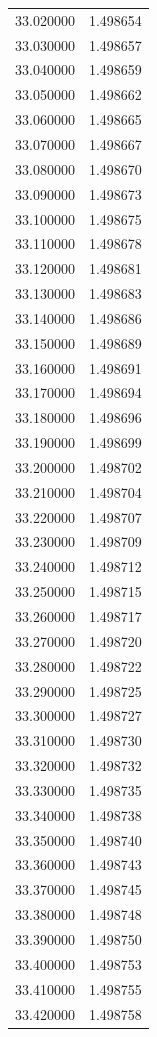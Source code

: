 \begin{tabular}{rr}
33.020000 & 1.498654 \\
33.030000 & 1.498657 \\
33.040000 & 1.498659 \\
33.050000 & 1.498662 \\
33.060000 & 1.498665 \\
33.070000 & 1.498667 \\
33.080000 & 1.498670 \\
33.090000 & 1.498673 \\
33.100000 & 1.498675 \\
33.110000 & 1.498678 \\
33.120000 & 1.498681 \\
33.130000 & 1.498683 \\
33.140000 & 1.498686 \\
33.150000 & 1.498689 \\
33.160000 & 1.498691 \\
33.170000 & 1.498694 \\
33.180000 & 1.498696 \\
33.190000 & 1.498699 \\
33.200000 & 1.498702 \\
33.210000 & 1.498704 \\
33.220000 & 1.498707 \\
33.230000 & 1.498709 \\
33.240000 & 1.498712 \\
33.250000 & 1.498715 \\
33.260000 & 1.498717 \\
33.270000 & 1.498720 \\
33.280000 & 1.498722 \\
33.290000 & 1.498725 \\
33.300000 & 1.498727 \\
33.310000 & 1.498730 \\
33.320000 & 1.498732 \\
33.330000 & 1.498735 \\
33.340000 & 1.498738 \\
33.350000 & 1.498740 \\
33.360000 & 1.498743 \\
33.370000 & 1.498745 \\
33.380000 & 1.498748 \\
33.390000 & 1.498750 \\
33.400000 & 1.498753 \\
33.410000 & 1.498755 \\
33.420000 & 1.498758 \\

\end{tabular}
